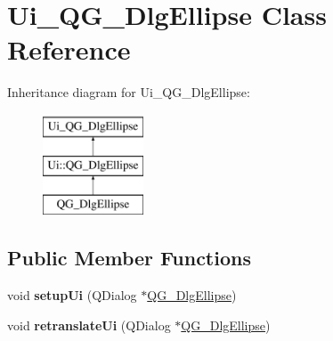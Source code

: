 \hypertarget{classUi__QG__DlgEllipse}{\section{Ui\-\_\-\-Q\-G\-\_\-\-Dlg\-Ellipse Class Reference}
\label{classUi__QG__DlgEllipse}
}
Inheritance diagram for Ui\-\_\-\-Q\-G\-\_\-\-Dlg\-Ellipse\-:\begin{figure}[H]
\begin{center}
\leavevmode
\includegraphics[height=3.000000cm]{classUi__QG__DlgEllipse}
\end{center}
\end{figure}
\subsection*{Public Member Functions}
\begin{DoxyCompactItemize}
\item 
\hypertarget{classUi__QG__DlgEllipse_ada1d92ef5ef9205bffe1c98e5e2127ec}{void {\bfseries setup\-Ui} (Q\-Dialog $\ast$\hyperlink{classQG__DlgEllipse}{Q\-G\-\_\-\-Dlg\-Ellipse})}\label{classUi__QG__DlgEllipse_ada1d92ef5ef9205bffe1c98e5e2127ec}

\item 
\hypertarget{classUi__QG__DlgEllipse_aea33187d6bb54d6b0a306c0709c5018a}{void {\bfseries retranslate\-Ui} (Q\-Dialog $\ast$\hyperlink{classQG__DlgEllipse}{Q\-G\-\_\-\-Dlg\-Ellipse})}\label{classUi__QG__DlgEllipse_aea33187d6bb54d6b0a306c0709c5018a}

\end{DoxyCompactItemize}
